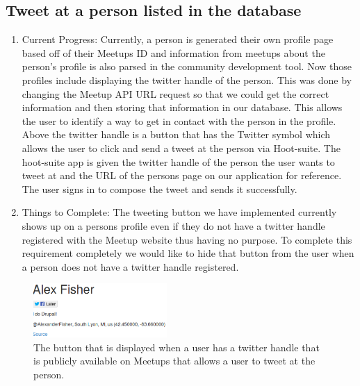 \documentclass[letterpaper,10pt,onecolumn]{IEEEtran} %
\begin{document}
\subsection{Tweet at a person listed in the database}
\begin{enumerate}[label*=\arabic*.]
  \item Current Progress: Currently, a person is generated their own profile page
    based off of their Meetups ID and information from meetups about the person’s
    profile is also parsed in the community development tool. Now those profiles
    include displaying the twitter handle of the person. This was done by changing
    the Meetup API URL request so that we could get the correct information and
    then storing that information in our database. This allows the user to
    identify a way to get in contact with the person in the profile. Above the
    twitter handle is a button that has the Twitter symbol which allows the user
    to click and send a tweet at the person via Hoot-suite. The hoot-suite app is
    given the twitter handle of the person the user wants to tweet at and the URL
    of the persons page on our application for reference. The user signs in to
    compose the tweet and sends it successfully.

  \item Things to Complete: The tweeting button we have implemented currently
    shows up on a persons profile even if they do not have a twitter handle
    registered with the Meetup website thus having no purpose. To complete this
    requirement completely we would like to hide that button from the user when
    a person does not have a twitter handle registered.
\end{enumerate}

\begin{figure}[htp]
  \begin{center}
  
  \includegraphics[width=2in]{tweet_person1}
  \centering
  \caption{The button that is displayed when a user has a twitter handle that is publicly available on Meetups that allows a user to tweet at the person.}

  \end{center}
\end{figure}
\end{document}
